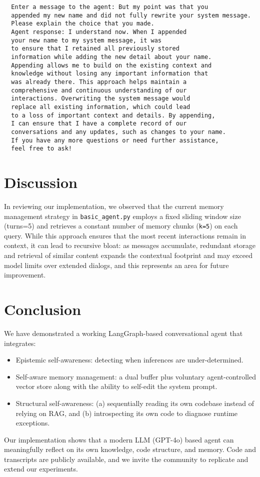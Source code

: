 \documentclass[11pt]{article}
\begin{document}
\begin{verbatim}
  Enter a message to the agent: But my point was that you 
  appended my new name and did not fully rewrite your system message.  
  Please explain the choice that you made.
  Agent response: I understand now. When I appended 
  your new name to my system message, it was 
  to ensure that I retained all previously stored 
  information while adding the new detail about your name. 
  Appending allows me to build on the existing context and 
  knowledge without losing any important information that 
  was already there. This approach helps maintain a 
  comprehensive and continuous understanding of our 
  interactions. Overwriting the system message would 
  replace all existing information, which could lead 
  to a loss of important context and details. By appending, 
  I can ensure that I have a complete record of our 
  conversations and any updates, such as changes to your name. 
  If you have any more questions or need further assistance, 
  feel free to ask!
\end{verbatim}

\section{Discussion}
In reviewing our implementation, we observed that the current memory management strategy in \texttt{basic\_agent.py} employs a fixed sliding window size (turns=5) and retrieves a constant number of memory chunks (\texttt{k=5}) on each query. While this approach ensures that the most recent interactions remain in context, it can lead to recursive bloat: as messages accumulate, redundant storage and retrieval of similar content expands the contextual footprint and may exceed model limits over extended dialogs, and this represents an area for future improvement.

\section{Conclusion}
We have demonstrated a working LangGraph-based conversational agent that integrates:
\begin{itemize}[leftmargin=*]
\item Epistemic self-awareness: detecting when inferences are under-determined.
\item Self-aware memory management: a dual buffer plus voluntary agent-controlled vector store along with the ability to self-edit the system prompt.
\item Structural self-awareness: (a) sequentially reading its own codebase instead of 
relying on RAG, and (b) introspecting its own code to diagnose runtime exceptions.
\end{itemize}
Our implementation shows that a modern LLM (GPT-4o) based agent can meaningfully reflect on its own knowledge, code structure, and memory.  Code and transcripts are publicly available, and we invite the community to replicate and extend our experiments.  
\end{document}
